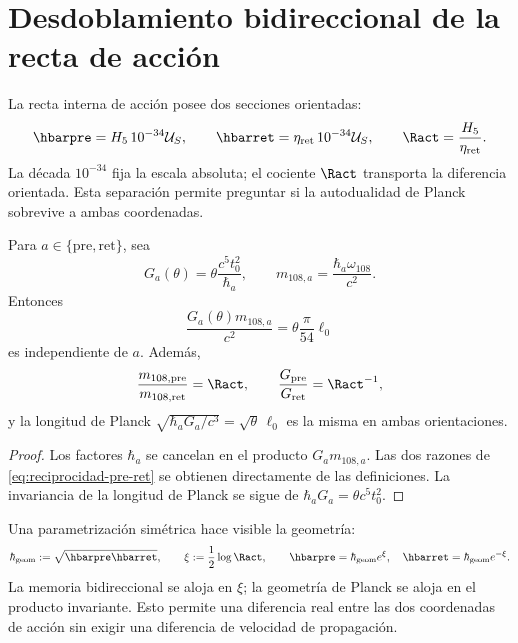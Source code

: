 \section{Desdoblamiento bidireccional de la recta de acción}

La recta interna de acción posee dos secciones orientadas:
\begin{equation}
\hbarpre=H_5\,10^{-34}\mathcal U_S,
\qquad
\hbarret=\eta_{\mathrm{ret}}\,10^{-34}\mathcal U_S,
\qquad
\Ract=\frac{H_5}{\eta_{\mathrm{ret}}}.
\label{eq:hbar-pre-ret-anexo}
\end{equation}
La década \(10^{-34}\) fija la escala absoluta; el cociente \(\Ract\)
transporta la diferencia orientada. Esta separación permite preguntar si la
autodualidad de Planck sobrevive a ambas coordenadas.

\begin{theorem}
\label{thm:accion-gravedad-reciproca}
Para \(a\in\{\mathrm{pre},\mathrm{ret}\}\), sea
\[
G_a(\theta)=\theta\frac{c^5t_0^2}{\hbar_a},
\qquad
m_{108,a}=\frac{\hbar_a\omega_{108}}{c^2}.
\]
Entonces
\begin{equation}
\frac{G_a(\theta)m_{108,a}}{c^2}
=\theta\frac{\pi}{54}\ell_0
\label{eq:invariante-pre-ret-planck}
\end{equation}
es independiente de \(a\). Además,
\begin{equation}
\frac{m_{108,\mathrm{pre}}}{m_{108,\mathrm{ret}}}=\Ract,
\qquad
\frac{G_{\mathrm{pre}}}{G_{\mathrm{ret}}}=\Ract^{-1},
\label{eq:reciprocidad-pre-ret}
\end{equation}
y la longitud de Planck
\(\sqrt{\hbar_aG_a/c^3}=\sqrt\theta\,\ell_0\) es la misma en ambas
orientaciones.
\end{theorem}

\begin{proof}
Los factores \(\hbar_a\) se cancelan en el producto \(G_am_{108,a}\).
Las dos razones de \eqref{eq:reciprocidad-pre-ret} se obtienen directamente
de las definiciones. La invariancia de la longitud de Planck se sigue de
\(\hbar_aG_a=\theta c^5t_0^2\).
\end{proof}

Una parametrización simétrica hace visible la geometría:
\begin{equation}
\hbar_{\mathrm{geom}}:=\sqrt{\hbarpre\hbarret},
\qquad
\xi:=\frac12\log\Ract,
\qquad
\hbarpre=\hbar_{\mathrm{geom}}e^\xi,
\quad
\hbarret=\hbar_{\mathrm{geom}}e^{-\xi}.
\label{eq:rapidez-accion-pre-ret}
\end{equation}
La memoria bidireccional se aloja en \(\xi\); la geometría de Planck se
aloja en el producto invariante. Esto permite una diferencia real entre las
dos coordenadas de acción sin exigir una diferencia de velocidad de
propagación.

